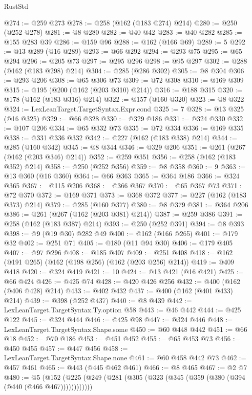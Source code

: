 \begin{lexlean}{RustStd}
\begin{coremodule}
@274 := @259 @273
@278 := @258 (@162 (@183 @274) @214)
@280 := @250 (@252 @278)
@281 := @8 @280
@282 := @40 @42
@283 := @40 @282
@285 := @155 @283 @39
@286 := @159 @96
@288 := @162 (@166 @69)
@289 := 5
@292 := @13 @289 (@16 @289)
@293 := @66 @292
@294 := @293 @75
@295 := @65 @294
@296 := @205 @73
@297 := @295 @296
@298 := @95 @297
@302 := @288 (@162 (@183 @298) @214)
@304 := @285 (@286 @302)
@305 := @8 @304
@306 := @293 @206
@308 := @65 @306 @73
@309 := @72 @308
@310 := @169 @309
@315 := @195 (@200 (@162 (@203 @310) @214))
@316 := @188 @315
@320 := @178 (@162 (@183 @316) @214)
@322 := @157 (@160 @320)
@323 := @8 @322
@324 := LexLeanTarget.TargetSyntax.Expr.cond
@325 := 7
@328 := @13 @325 (@16 @325)
@329 := @66 @328
@330 := @329 @186
@331 := @324 @330
@332 := @107 @206
@334 := @65 @332 @73
@335 := @72 @334
@336 := @169 @335
@338 := @331 @336 @332
@342 := @227 (@162 (@183 @338) @214)
@344 := @285 (@160 @342)
@345 := @8 @344
@346 := @329 @206
@351 := @261 (@267 (@162 (@203 @346) @214))
@352 := @259 @351
@356 := @258 (@162 (@183 @352) @214)
@358 := @250 (@252 @356)
@359 := @8 @358
@360 := 9
@363 := @13 @360 (@16 @360)
@364 := @66 @363
@365 := @364 @186
@366 := @324 @365
@367 := @115 @206
@368 := @366 @367
@370 := @65 @367 @73
@371 := @72 @370
@372 := @169 @371
@373 := @368 @372
@377 := @227 (@162 (@183 @373) @214)
@379 := @285 (@160 @377)
@380 := @8 @379
@381 := @364 @206
@386 := @261 (@267 (@162 (@203 @381) @214))
@387 := @259 @386
@391 := @258 (@162 (@183 @387) @214)
@393 := @250 (@252 @391)
@394 := @8 @393
@398 := @9 (@19 @30) @282 @49
@400 := @162 (@166 @265)
@401 := @179 @32
@402 := @251 @71
@405 := @180 (@11 @94 @30)
@406 := @179 @405
@407 := @97 @296
@408 := @185 @407
@409 := @251 @408
@418 := @162 (@191 @265) (@162 (@198 @256) (@162 (@203 @256) @214))
@419 := @409 @418
@420 := @324 @419
@421 := 10
@424 := @13 @421 (@16 @421)
@425 := @66 @424
@426 := @425 @74
@428 := @420 @426 @256
@432 := @400 (@162 (@406 @428) @214)
@433 := @402 @432
@437 := @400 (@162 (@401 @433) @214)
@439 := @398 (@252 @437)
@440 := @8 @439
@442 := LexLeanTarget.TargetSyntax.Ty.option @58
@443 := @46 @442
@444 := @425 @122
@445 := @324 @444
@446 := @425 @98
@447 := @324 @446
@448 := LexLeanTarget.TargetSyntax.Shape.some
@450 := @60 @448 @442
@451 := @66 @18
@452 := @70 @186
@453 := @451 @452
@455 := @65 @453 @73
@456 := @450 @455
@457 := @447 @456
@458 := LexLeanTarget.TargetSyntax.Shape.none
@461 := @60 @458 @442 @73
@462 := @457 @461
@465 := @443 (@445 @462 @461)
@466 := @8 @465
@467 := @2 @7
@480 := @5 (@152 (@225 (@249 (@281 (@305 (@323 (@345 (@359 (@380 (@394 (@440 (@466 @467))))))))))))

\end{coremodule}
\end{lexlean}

